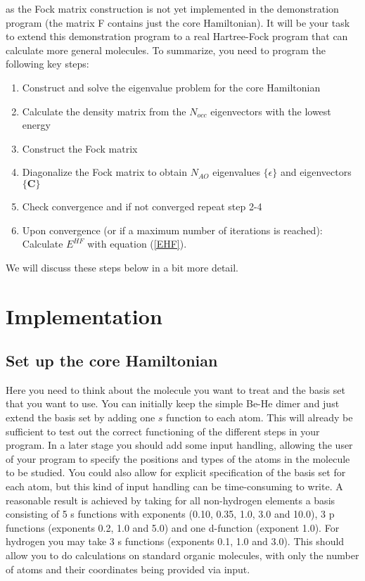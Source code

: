 \documentclass[11pt, bibliography=totoc]{scrartcl}
\begin{document}
as the Fock matrix construction is not yet implemented in the demonstration program (the matrix F contains just the core Hamiltonian). It will be your task to extend this demonstration program to a real Hartree-Fock program that can calculate more general molecules. To summarize, you need to program the following key steps:
 
\begin{enumerate}
  \item Construct and solve the eigenvalue problem for the core Hamiltonian
  \item Calculate the density matrix from the $N_{occ}$ eigenvectors with the lowest energy
  \item Construct the Fock matrix
  \item Diagonalize the Fock matrix to obtain $N_{AO}$ eigenvalues $\{\epsilon\}$ and eigenvectors $\{\mathbf{C}\}$
  \item Check convergence and if not converged repeat step 2-4
  \item Upon convergence (or if a maximum number of iterations is reached): Calculate $E^{HF}$ with equation (\ref{EHF}).
\end{enumerate}

We will discuss these steps below in a bit more detail.

\section{Implementation}

\subsection{Set up the core Hamiltonian}
Here you need to think about the molecule you want to treat and the basis set that you want to use. You can initially keep the simple Be-He dimer and just extend the basis set by adding one $s$ function to each atom. This will already be sufficient to test out the correct functioning of the different steps in your program. In a later stage you should add some input handling, allowing the user of your program to specify the positions and types of the atoms in the molecule to be studied. You could also allow for explicit specification of the basis set for each atom, but this kind of input handling can be time-consuming to write. A reasonable result is achieved by taking for all non-hydrogen elements a basis consisting of 5 s functions with exponents (0.10, 0.35, 1.0, 3.0 and 10.0), 3 p functions (exponents 0.2, 1.0 and 5.0) and one d-function (exponent 1.0). For hydrogen you may take 3 s functions (exponents 0.1, 1.0 and 3.0). This should allow you to do calculations on standard organic molecules, with only the number of atoms and their coordinates being provided via input.
\end{document}
